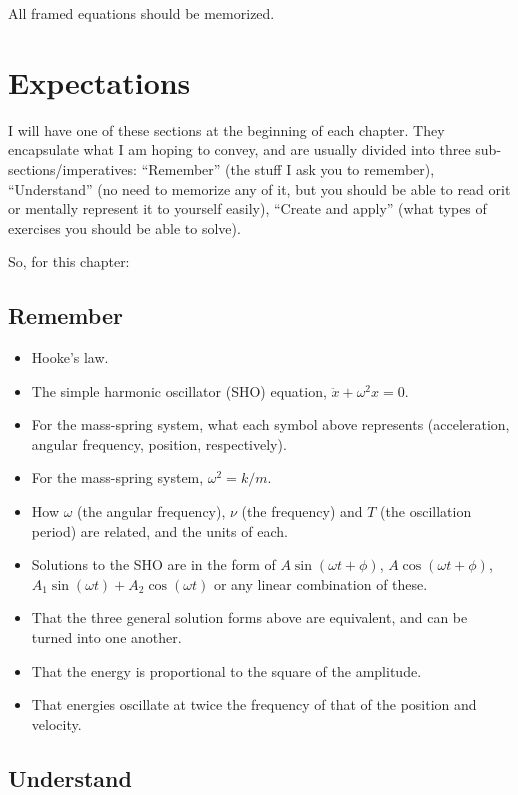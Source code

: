 \documentclass[11pt]{article}
\providecommand{\tightlist}{%
      \setlength{\itemsep}{0pt}\setlength{\parskip}{0pt}}
\begin{document}
All framed equations should be memorized.

    \hypertarget{expectations}{%
\section{Expectations}\label{expectations}}

I will have one of these sections at the beginning of each chapter. They
encapsulate what I am hoping to convey, and are usually divided into
three sub-sections/imperatives: ``Remember'' (the stuff I ask you to
remember), ``Understand'' (no need to memorize any of it, but you should
be able to read orit or mentally represent it to yourself easily),
``Create and apply'' (what types of exercises you should be able to
solve).

So, for this chapter:

    \hypertarget{remember}{%
\subsection{Remember}\label{remember}}

\begin{itemize}
\tightlist
\item
  Hooke's law.
\item
  The simple harmonic oscillator (SHO) equation,
  \(\ddot x + \omega^2 x = 0\).
\item
  For the mass-spring system, what each symbol above represents
  (acceleration, angular frequency, position, respectively).
\item
  For the mass-spring system, \(\omega^2 = k/m\).
\item
  How \(\omega\) (the angular frequency), \(\nu\) (the frequency) and
  \(T\) (the oscillation period) are related, and the units of each.
\item
  Solutions to the SHO are in the form of \(A\sin(\omega t + \phi)\),
  \(A\cos(\omega t + \phi)\), \(A_1\sin(\omega t) + A_2\cos(\omega t)\)
  or any linear combination of these.
\item
  That the three general solution forms above are equivalent, and can be
  turned into one another.
\item
  That the energy is proportional to the square of the amplitude.
\item
  That energies oscillate at twice the frequency of that of the position
  and velocity.
\end{itemize}

    \hypertarget{understand}{%
\subsection{Understand}\label{understand}}
\end{document}
